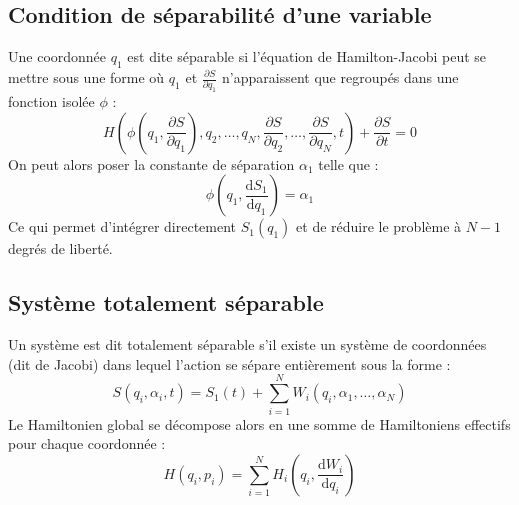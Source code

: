 \documentclass[french]{yLectureNote}
\newcommand{\dd}{\mathrm{d}}
\begin{document}
\subsection{Condition de séparabilité d'une variable}
Une coordonnée $q_1$ est dite séparable si l'équation de Hamilton-Jacobi peut se mettre sous une forme où $q_1$ et $\frac{\partial S}{\partial q_1}$ n'apparaissent que regroupés dans une fonction isolée $\phi$ :
\begin{equation}
    H\left( \phi\left(q_1, \frac{\partial S}{\partial q_1}\right), q_2, \dots, q_N, \frac{\partial S}{\partial q_2}, \dots, \frac{\partial S}{\partial q_N}, t \right) + \frac{\partial S}{\partial t} = 0
\end{equation}
On peut alors poser la constante de séparation $\alpha_1$ telle que :
\begin{equation}
    \phi\left(q_1, \frac{\dd S_1}{\dd q_1}\right) = \alpha_1
\end{equation}
Ce qui permet d'intégrer directement $S_1(q_1)$ et de réduire le problème à $N-1$ degrés de liberté.

\subsection{Système totalement séparable}
\begin{proposition}
Un système est dit totalement séparable s'il existe un système de coordonnées (dit de Jacobi) dans lequel l'action se sépare entièrement sous la forme :
\begin{equation}
    S(q_i, \alpha_i, t) = S_1(t) + \sum_{i=1}^N W_i(q_i, \alpha_1, \dots, \alpha_N)
\end{equation}
Le Hamiltonien global se décompose alors en une somme de Hamiltoniens effectifs pour chaque coordonnée :
\begin{equation}
    H(q_i, p_i) = \sum_{i=1}^N H_i\left(q_i, \frac{\dd W_i}{\dd q_i}\right)
\end{equation}
\end{proposition}

\end{document}
